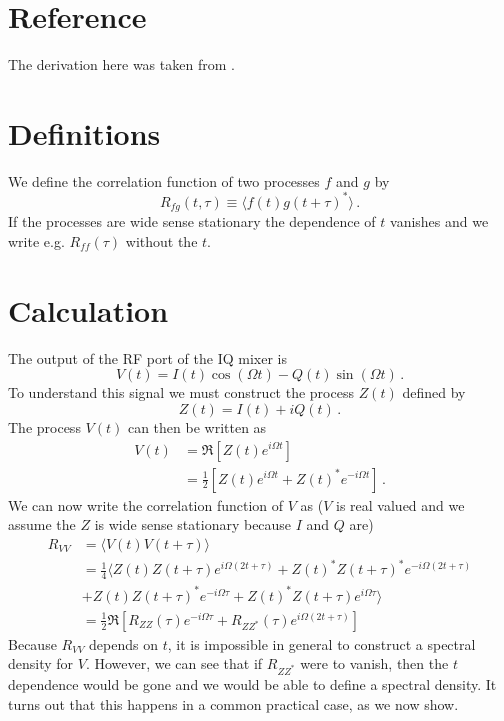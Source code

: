 \section{Reference}

The derivation here was taken from \cite{MattL:modulated_noise:2015}.

\section{Definitions}

We define the correlation function of two processes $f$ and $g$ by
\begin{equation}
R_{fg}(t, \tau) \equiv  \langle f(t) g(t+\tau)^* \rangle \, .
\end{equation}
If the processes are wide sense stationary the dependence of $t$ vanishes and we write e.g. $R_{ff}(\tau)$ without the $t$.


\section{Calculation}

The output of the RF port of the IQ mixer is
\begin{equation}
V(t) = I(t) \cos(\Omega t) - Q(t) \sin(\Omega t) \, .
\end{equation}
To understand this signal we must construct the process $Z(t)$ defined by
\begin{equation}
Z(t) = I(t) + i Q(t) \, .
\end{equation}
The process $V(t)$ can then be written as
\begin{align}
V(t)
&= \Re \left[ Z(t) e^{i \Omega t} \right] \\
&= \frac{1}{2} \left[ Z(t) e^{i \Omega t} + Z(t)^* e^{-i \Omega t} \right] \, .
\end{align}
We can now write the correlation function of $V$ as ($V$ is real valued and we assume the $Z$ is wide sense stationary because $I$ and $Q$ are)
\begin{align}
R_{VV}
&= \langle V(t) V(t+\tau) \rangle \\
&= \frac{1}{4} \langle
Z(t)Z(t+\tau) e^{i\Omega (2t + \tau)}
+ Z(t)^* Z(t+\tau)^* e^{-i\Omega (2t + \tau)} \\
& + Z(t) Z(t+\tau)^* e^{-i \Omega \tau}
+ Z(t)^* Z(t+\tau) e^{i \Omega \tau}
\rangle \\
&= \frac{1}{2} \Re \left[ R_{ZZ}(\tau) e^{-i \Omega \tau}
+ R_{ZZ^*}(\tau) e^{i \Omega (2t + \tau)} \right]
\end{align}
Because $R_{VV}$ depends on $t$, it is impossible in general to construct a spectral density for $V$.
However, we can see that if $R_{ZZ^*}$ were to vanish, then the $t$ dependence would be gone and we would be able to define a spectral density.
It turns out that this happens in a common practical case, as we now show.

